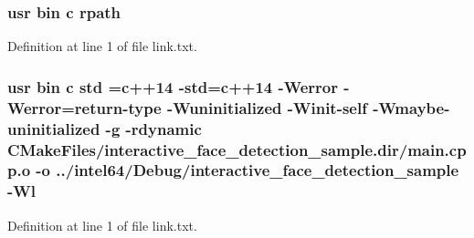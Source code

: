 \subsubsection[{\texorpdfstring{rpath}{rpath}}]{\setlength{\rightskip}{0pt plus 5cm}usr bin {\bf c} rpath}\hypertarget{interactive__face__detection__sample_2CMakeFiles_2interactive__face__detection__sample_8dir_2link_8txt_ab9d7fd7120fafa2118a4e08c1df697c7}{}\label{interactive__face__detection__sample_2CMakeFiles_2interactive__face__detection__sample_8dir_2link_8txt_ab9d7fd7120fafa2118a4e08c1df697c7}


Definition at line 1 of file link.\+txt.

\subsubsection[{\texorpdfstring{std}{std}}]{\setlength{\rightskip}{0pt plus 5cm}usr bin {\bf c} std ={\bf c}++14 -\/std={\bf c}++14 -\/Werror -\/Werror=return-\/type -\/Wuninitialized -\/Winit-\/self -\/Wmaybe-\/uninitialized -\/g -\/rdynamic C\+Make\+Files/interactive\+\_\+face\+\_\+detection\+\_\+sample.\+dir/main.\+cpp.\+o -\/o ../intel64/Debug/interactive\+\_\+face\+\_\+detection\+\_\+sample -\/{\bf Wl}}\hypertarget{interactive__face__detection__sample_2CMakeFiles_2interactive__face__detection__sample_8dir_2link_8txt_a1ccfea5f558575a112db71eeb271fabf}{}\label{interactive__face__detection__sample_2CMakeFiles_2interactive__face__detection__sample_8dir_2link_8txt_a1ccfea5f558575a112db71eeb271fabf}


Definition at line 1 of file link.\+txt.

